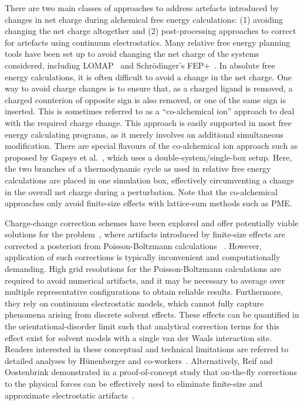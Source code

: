 \documentclass[9pt,bestpractices]{livecoms}
\begin{document}
There are two main classes of approaches to address artefacts introduced by changes in net charge during alchemical free energy calculations: (1) avoiding changing the net charge altogether and (2) post-processing approaches to correct for artefacts using continuum electrostatics.
Many relative free energy planning tools have been set up to avoid changing the net charge of the systems considered, including LOMAP~\cite{liu2013lead} and Schr\"{o}dinger's FEP+~\cite{wang2015accurate}. In absolute free energy calculations, it is often difficult to avoid a change in the net charge. One way to avoid charge changes is to ensure that, as a charged ligand is removed, a charged counterion of opposite sign is also removed, or one of the same sign is inserted. This is sometimes referred to as a “co-alchemical ion” approach to deal with the required charge change. This approach is easily supported in most free energy calculating programs, as it merely involves an additional simultaneous modification.
There are special flavours of the co-alchemical ion approach such as proposed by Gapsys et al.~\cite{gapsys2015calculation}, which uses a double-system/single-box setup. Here, the two branches of a thermodynamic cycle as used in relative free energy calculations are placed in one simulation box, effectively circumventing a change in the overall net charge during a perturbation. Note that the co-alchemical approaches only avoid finite-size effects with lattice-sum methods such as PME.

Charge-change correction schemes have been explored and offer potentially viable solutions for the problem~\cite{mey2018impact}, where artifacts introduced by finite-size effects are corrected a posteriori from Poisson-Boltzmann calculations ~\cite{chen2018accurate, ohlknecht2020correcting, rocklin2013calculating,Reif2014chargecorrection}. However, application of such corrections is typically inconvenient and computationally demanding. High grid resolutions for the Poisson-Boltzmann calculations are required to avoid numerical artifacts, and it may be necessary to average over multiple representative configurations to obtain reliable results. Furthermore, they rely on continuum electrostatic models, which cannot fully capture phenomena arising from discrete solvent effects. These effects can be quantified in the orientational-disorder limit such that analytical correction terms for this effect exist for solvent models with a single van der Waals interaction site. Readers interested in these conceptual and technical limitations are referred to detailed analyses by Hünenberger and co-workers~\cite{kastenholz2006solvfe, rocklin2013calculating}.
Alternatively, Reif and Oostenbrink demonstrated in a proof-of-concept study that on-the-fly corrections to the physical forces can be effectively used to eliminate finite-size and approximate electrostatic artifacts~\cite{Reif2015onthefly}.
\end{document}
